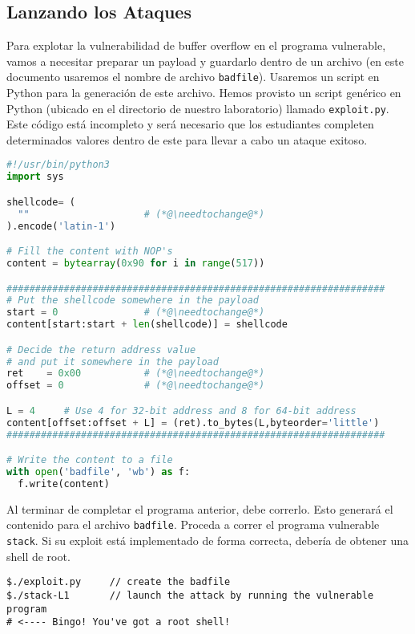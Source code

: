 \subsection{Lanzando los Ataques} 


Para explotar la vulnerabilidad de buffer overflow en el programa vulnerable, vamos a necesitar preparar un payload y guardarlo dentro de un archivo (en este documento usaremos el nombre de archivo \texttt{badfile}).
Usaremos un script en Python para la generación de este archivo. 
Hemos provisto un script genérico en Python (ubicado en el directorio de nuestro laboratorio) llamado \texttt{exploit.py}.
Este código está incompleto y será necesario que los estudiantes completen determinados valores dentro de este para llevar a cabo un ataque exitoso.


\newcommand{\needtochange}{\ding{73} Necesita completarse \ding{73}}


\begin{lstlisting}[language=python, caption={\texttt{exploit.py}}]
#!/usr/bin/python3
import sys

shellcode= (
  ""                    # (*@\needtochange@*)
).encode('latin-1')

# Fill the content with NOP's
content = bytearray(0x90 for i in range(517))

##################################################################
# Put the shellcode somewhere in the payload
start = 0               # (*@\needtochange@*)
content[start:start + len(shellcode)] = shellcode

# Decide the return address value
# and put it somewhere in the payload
ret    = 0x00           # (*@\needtochange@*)
offset = 0              # (*@\needtochange@*)

L = 4     # Use 4 for 32-bit address and 8 for 64-bit address
content[offset:offset + L] = (ret).to_bytes(L,byteorder='little')
##################################################################

# Write the content to a file
with open('badfile', 'wb') as f:
  f.write(content)
\end{lstlisting}

Al terminar de completar el programa anterior, debe correrlo. Esto generará el contenido para el archivo \texttt{badfile}. Proceda a correr el programa vulnerable {\tt stack}. Si su exploit está implementado de forma correcta, debería de obtener una shell de root.


\begin{lstlisting}
$./exploit.py     // create the badfile
$./stack-L1       // launch the attack by running the vulnerable program
# <---- Bingo! You've got a root shell! 
\end{lstlisting}

